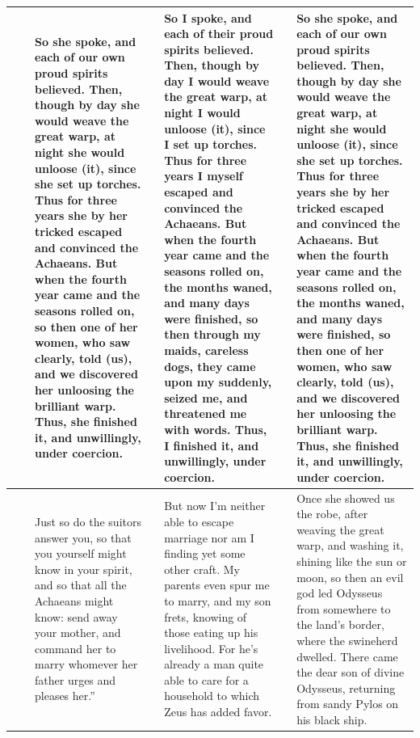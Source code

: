 \documentclass[12pt]{article}
\begin{document}
\begin{table}
\begin{singlespacing}
\begin{tiny}
\begin{center}
\begin{tabularx}{\textheight}{
|c
||c
:>{\lefting\arraybackslash}X
||c
:>{\lefting\arraybackslash}X
||c
:>{\lefting\arraybackslash}X
|
}
\parbox{}{} & \parbox{}{} & So she spoke, and each of our own proud spirits believed. Then, though by day she would weave the great warp, at night she would unloose (it), since she set up torches. Thus for three years she by her tricked escaped and convinced the Achaeans. But when the fourth year came and the seasons rolled on, so then one of her women, who saw clearly, told (us), and we discovered her unloosing the brilliant warp. Thus, she finished it, and unwillingly, under coercion. & \parbox{}{} & So I spoke, and each of their proud spirits believed. Then, though by day I would weave the great warp, at night I would unloose (it), since I set up torches. Thus for three years I myself escaped and convinced the Achaeans. But when the fourth year came and the seasons rolled on, the months waned, and many days were finished, so then through my maids, careless dogs, they came upon my suddenly, seized me, and threatened me with words. Thus, I finished it, and unwillingly, under coercion. & \parbox{}{} & So she spoke, and each of our own proud spirits believed. Then, though by day she would weave the great warp, at night she would unloose (it), since she set up torches. Thus for three years she by her tricked escaped and convinced the Achaeans. But when the fourth year came and the seasons rolled on, the months waned, and many days were finished, so then one of her women, who saw clearly, told (us), and we discovered her unloosing the brilliant warp. Thus, she finished it, and unwillingly, under coercion. \\
\hline
\parbox{}{} & \parbox{}{} & Just so do the suitors answer you, so that you yourself might know in your spirit, and so that all the Achaeans might know: send away your mother, and command her to marry whomever her father urges and pleases her.'' & \parbox{}{} & But now I'm neither able to escape marriage nor am I finding yet some other craft. My parents even spur me to marry, and my son frets, knowing of those eating up his livelihood. For he's already a man quite able to care for a household to which Zeus has added favor. & \parbox{}{} & Once she showed us the robe, after weaving the great warp, and washing it, shining like the sun or moon, so then an evil god led Odysseus from somewhere to the land's border, where the swineherd dwelled. There came the dear son of divine Odysseus, returning from sandy Pylos on his black ship. \\
\hline

\end{tabularx}
\end{center}
\end{tiny}
\end{singlespacing}

\end{table}
\end{document}
